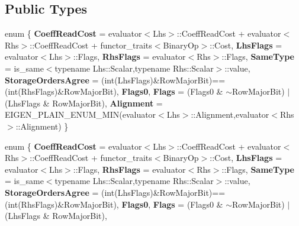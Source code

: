 \subsection*{Public Types}
\begin{DoxyCompactItemize}
\item 
\mbox{\label{struct_eigen_1_1internal_1_1binary__evaluator_3_01_cwise_binary_op_3_01_binary_op_00_01_lhs_00_009c1543c08828196fc8ade7d79a56c66_a49e2790552c1a951e26cb3857aeae14f}} 
enum \{ \newline
{\bfseries Coeff\+Read\+Cost} = evaluator$<$Lhs$>$\+:\+:Coeff\+Read\+Cost + evaluator$<$Rhs$>$\+:\+:Coeff\+Read\+Cost + functor\+\_\+traits$<$Binary\+Op$>$\+:\+:Cost, 
{\bfseries Lhs\+Flags} = evaluator$<$Lhs$>$\+:\+:Flags, 
{\bfseries Rhs\+Flags} = evaluator$<$Rhs$>$\+:\+:Flags, 
{\bfseries Same\+Type} = is\+\_\+same$<$typename Lhs\+:\+:Scalar,typename Rhs\+:\+:Scalar$>$\+:\+:value, 
\newline
{\bfseries Storage\+Orders\+Agree} = (int(Lhs\+Flags)\&Row\+Major\+Bit)==(int(Rhs\+Flags)\&Row\+Major\+Bit), 
{\bfseries Flags0}, 
{\bfseries Flags} = (Flags0 \& $\sim$\+Row\+Major\+Bit) $\vert$ (Lhs\+Flags \& Row\+Major\+Bit), 
{\bfseries Alignment} = E\+I\+G\+E\+N\+\_\+\+P\+L\+A\+I\+N\+\_\+\+E\+N\+U\+M\+\_\+\+M\+IN(evaluator$<$Lhs$>$\+:\+:Alignment,evaluator$<$Rhs$>$\+:\+:Alignment)
 \}
\item 
\mbox{\label{struct_eigen_1_1internal_1_1binary__evaluator_3_01_cwise_binary_op_3_01_binary_op_00_01_lhs_00_009c1543c08828196fc8ade7d79a56c66_ace21b4d45f48b56efe35c37255d57af3}} 
enum \{ \newline
{\bfseries Coeff\+Read\+Cost} = evaluator$<$Lhs$>$\+:\+:Coeff\+Read\+Cost + evaluator$<$Rhs$>$\+:\+:Coeff\+Read\+Cost + functor\+\_\+traits$<$Binary\+Op$>$\+:\+:Cost, 
{\bfseries Lhs\+Flags} = evaluator$<$Lhs$>$\+:\+:Flags, 
{\bfseries Rhs\+Flags} = evaluator$<$Rhs$>$\+:\+:Flags, 
{\bfseries Same\+Type} = is\+\_\+same$<$typename Lhs\+:\+:Scalar,typename Rhs\+:\+:Scalar$>$\+:\+:value, 
\newline
{\bfseries Storage\+Orders\+Agree} = (int(Lhs\+Flags)\&Row\+Major\+Bit)==(int(Rhs\+Flags)\&Row\+Major\+Bit), 
{\bfseries Flags0}, 
{\bfseries Flags} = (Flags0 \& $\sim$\+Row\+Major\+Bit) $\vert$ (Lhs\+Flags \& Row\+Major\+Bit), 

\end{DoxyCompactItemize}
